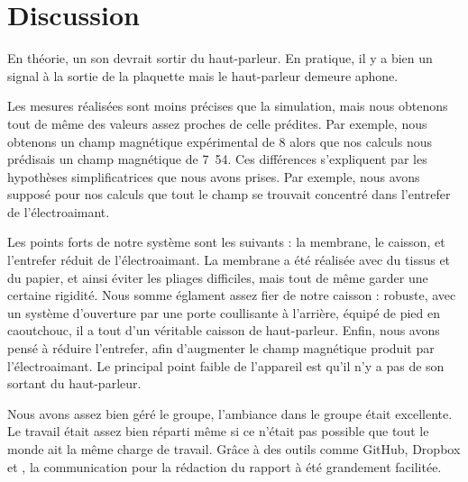 

\section{Discussion}

En théorie, un son devrait sortir du haut-parleur.  En pratique, il y a bien un signal
à la sortie de la plaquette mais le haut-parleur demeure aphone. 

Les mesures réalisées sont moins précises que la simulation, mais nous obtenons tout de même 
des valeurs assez proches de celle prédites.  Par exemple, nous obtenons un champ magnétique
expérimental de \unit{8}{\centi\tesla} alors que nos calculs nous prédisais un champ magnétique de
\unit{7.54}{\centi\tesla}. Ces différences s'expliquent par les hypothèses simplificatrices
que nous avons prises. Par exemple, nous avons supposé pour nos calculs que tout le champ se trouvait 
concentré dans l'entrefer de l'électroaimant.

Les points forts de notre système sont les suivants : la membrane, le caisson, et l'entrefer réduit de l'électroaimant. 
La membrane a été réalisée avec du tissus et du papier, et ainsi éviter les pliages difficiles, mais tout de même garder 
une certaine rigidité. Nous somme églament assez fier de notre caisson : robuste, avec un système d'ouverture par une porte
coullisante à l'arrière, équipé de pied en caoutchouc, il a tout d'un véritable caisson de haut-parleur. Enfin, nous avons 
pensé à réduire l'entrefer, afin d'augmenter le champ magnétique produit par l'électroaimant. Le principal point faible de 
l'appareil est qu'il n'y a pas de son sortant du haut-parleur.

Nous avons assez bien géré le groupe, l'ambiance dans le groupe était excellente. Le travail était assez bien réparti
même si ce n'était pas possible que tout le monde ait la même charge de travail. Grâce à des outils comme GitHub, Dropbox et 
\Latex, la communication pour la rédaction du rapport à été grandement facilitée.

